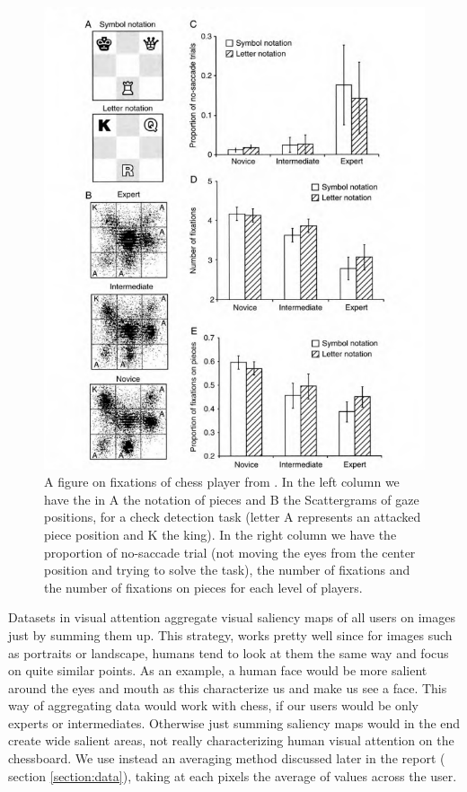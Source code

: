 \begin{figure}
    \centering
    \includegraphics[scale=0.35]{./results/reingold_emptypieces.png}
    \caption{A figure on fixations of chess player from \cite{doi:10.1167/17.3.4}. In the left column we have the in A the notation of pieces and B the Scattergrams of gaze positions, for a check detection task (letter A represents an attacked piece position and K the king). In the right column we have the proportion of no-saccade trial (not moving the eyes from the center position and trying to solve the task), the number of fixations and the number of fixations on pieces for each level of players.}
    \label{fig:fixationsempty}
\end{figure}

Datasets in visual attention aggregate visual saliency maps of all users on images just by summing them up. This strategy, works pretty well since for images such as portraits or landscape, humans tend to look at them the same way and focus on quite similar points. As an example, a human face would be more salient around the eyes and mouth as this characterize us and make us see a face.
This way of aggregating data would work with chess, if our users would be only experts or intermediates. Otherwise just summing saliency maps would in the end create wide salient areas, not really characterizing human visual attention on the chessboard. We use instead an averaging method discussed later in the report ( section \ref{section:data}), taking at each pixels the average of values across the user.



    
    